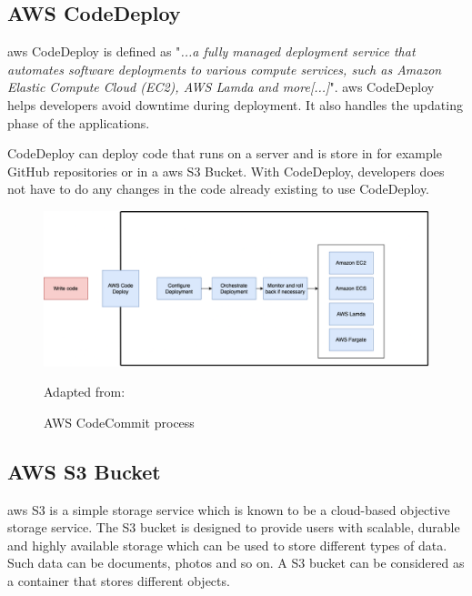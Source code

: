 \newpage
\subsection{AWS CodeDeploy}
\acrshort{aws} CodeDeploy is defined as "\textit{...a fully managed deployment service that automates software deployments to various compute services, such as Amazon Elastic Compute Cloud (EC2), AWS Lamda and more[...]}"\cite{AWSCodeDeploy}.
\acrshort{aws} CodeDeploy helps developers avoid downtime during deployment. It also handles the updating phase of the applications. 

CodeDeploy can deploy code that runs on a server and is store in for example GitHub repositories or in a \acrshort{aws} S3 Bucket. With CodeDeploy, developers does not have to do any changes in the code already existing to use CodeDeploy. \cite{CodeDeploy1}

\begin{figure}[htp]
    \centering
    \includegraphics[width=1\columnwidth]{Images/AWSCodeDeploy.png}
    \caption{AWS CodeCommit process} Adapted from: \cite{CodeDeploy1}
    \label{fig:my_label}
\end{figure}

\newpage

\subsection{AWS S3 Bucket}
\acrshort{aws} S3 is a simple storage service which is known to be a cloud-based objective storage service. The S3 bucket is designed to provide users with scalable, durable and highly available storage which can be used to store different types of data. Such data can be documents, photos and so on. 
A S3 bucket can be considered as a container that stores different objects. \cite{S3Bucket}